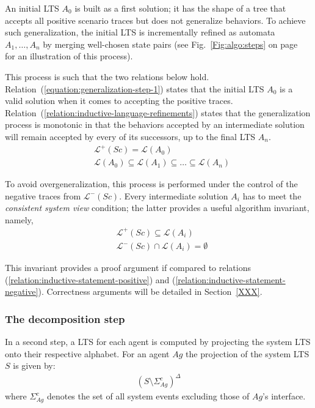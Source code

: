 An initial LTS $A_0$ is built as a first solution; it has the shape of a tree that accepts all positive scenario traces but does not generalize behaviors. To achieve such generalization, the initial LTS is incrementally refined as automata $A_1,\ldots,A_n$ by merging well-chosen state pairs (see Fig.~\ref{Fig:algo:steps} on page~\pageref{Fig:algo:steps} for an illustration of this process).

This process is such that the two relations below hold. Relation~(\ref{equation:generalization-step-1}) states that the initial LTS $A_0$ is a valid solution when it comes to accepting the positive traces. Relation~(\ref{relation:inductive-language-refinements}) states that the generalization process is monotonic in that the behaviors accepted by an intermediate solution will remain accepted by every of its successors, up to the final LTS $A_n$.
\begin{align}
&\mathcal{L}^+(Sc) = \mathcal{L}(A_0) \label{equation:generalization-step-1}\\
&\mathcal{L}(A_0) \subseteq \mathcal{L}(A_1) \subseteq \ldots \subseteq \mathcal{L}(A_n)
\label{relation:inductive-language-refinements}
\end{align}

To avoid overgeneralization, this process is performed under the control of the negative traces from $\mathcal{L}^-(Sc)$. Every intermediate solution $A_i$ has to meet the \emph{consistent system view} condition; the latter provides a useful algorithm invariant, namely,
\begin{align}
&\mathcal{L}^+(Sc) \subseteq \mathcal{L}(A_i)        \label{relation:inductive-invariant}\\
&\mathcal{L}^-(Sc) \cap \mathcal{L}(A_i) = \emptyset \label{relation:inductive-invariant-II}
\end{align}

This invariant provides a proof argument if compared to relations (\ref{relation:inductive-statement-positive}) and (\ref{relation:inductive-statement-negative}). Correctness arguments will be detailed in Section~\ref{XXX}.

\subsubsection*{The decomposition step}

In a second step, a LTS for each agent is computed by projecting the system LTS onto their respective alphabet. For an agent $Ag$ the projection of the system LTS $S$ is given by:
\begin{align}
(S \setminus \Sigma_{Ag}^c)^\Delta
\end{align}
\noindent where $\Sigma_{Ag}^c$ denotes the set of all system events excluding those of $Ag$'s interface.

